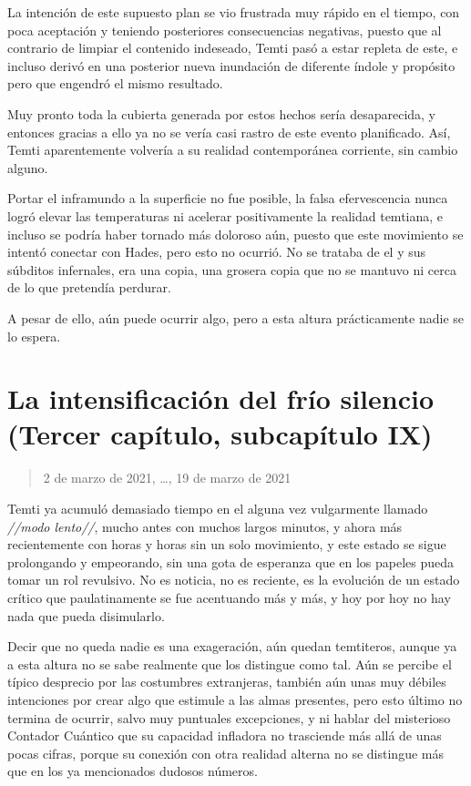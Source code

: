 \documentclass[
  spanish,
]{book}
\begin{document}
La intención de este supuesto plan se vio frustrada muy rápido en el tiempo, con poca aceptación y teniendo posteriores consecuencias negativas, puesto que al contrario de limpiar el contenido indeseado, Temti pasó a estar repleta de este, e incluso derivó en una posterior nueva inundación de diferente índole y propósito pero que engendró el mismo resultado.

Muy pronto toda la cubierta generada por estos hechos sería desaparecida, y entonces gracias a ello ya no se vería casi rastro de este evento planificado. Así, Temti aparentemente volvería a su realidad contemporánea corriente, sin cambio alguno.

Portar el inframundo a la superficie no fue posible, la falsa efervescencia nunca logró elevar las temperaturas ni acelerar positivamente la realidad temtiana, e incluso se podría haber tornado más doloroso aún, puesto que este movimiento se intentó conectar con Hades, pero esto no ocurrió. No se trataba de el y sus súbditos infernales, era una copia, una grosera copia que no se mantuvo ni cerca de lo que pretendía perdurar.

A pesar de ello, aún puede ocurrir algo, pero a esta altura prácticamente nadie se lo espera.

\hypertarget{la-intensificaciuxf3n-del-fruxedo-silencio-tercer-capuxedtulo-subcapuxedtulo-ix}{%
\section{La intensificación del frío silencio (Tercer capítulo, subcapítulo IX)}\label{la-intensificaciuxf3n-del-fruxedo-silencio-tercer-capuxedtulo-subcapuxedtulo-ix}}

\begin{quote}
2 de marzo de 2021, \ldots, 19 de marzo de 2021
\end{quote}

Temti ya acumuló demasiado tiempo en el alguna vez vulgarmente llamado \emph{//modo lento//}, mucho antes con muchos largos minutos, y ahora más recientemente con horas y horas sin un solo movimiento, y este estado se sigue prolongando y empeorando, sin una gota de esperanza que en los papeles pueda tomar un rol revulsivo. No es noticia, no es reciente, es la evolución de un estado crítico que paulatinamente se fue acentuando más y más, y hoy por hoy no hay nada que pueda disimularlo.

Decir que no queda nadie es una exageración, aún quedan temtiteros, aunque ya a esta altura no se sabe realmente que los distingue como tal. Aún se percibe el típico desprecio por las costumbres extranjeras, también aún unas muy débiles intenciones por crear algo que estimule a las almas presentes, pero esto último no termina de ocurrir, salvo muy puntuales excepciones, y ni hablar del misterioso Contador Cuántico que su capacidad infladora no trasciende más allá de unas pocas cifras, porque su conexión con otra realidad alterna no se distingue más que en los ya mencionados dudosos números.
\end{document}
